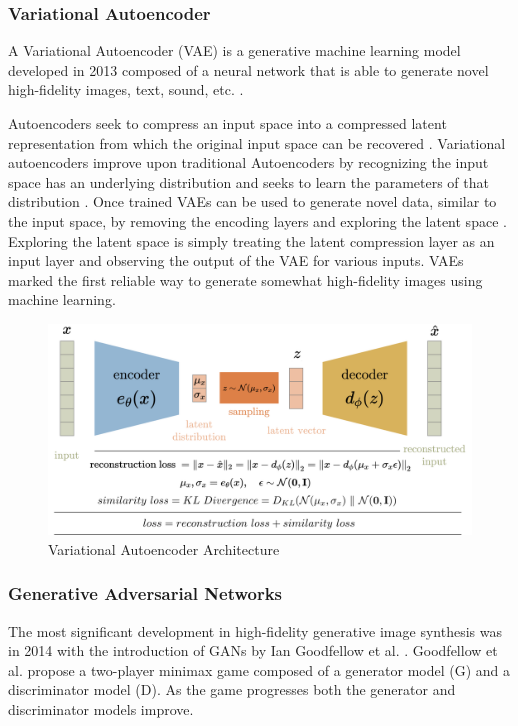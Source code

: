 \documentclass[%
 reprint,
 amsmath,amssymb,
 aps,
]{revtex4-2}
\begin{document}
\subsubsection{Variational Autoencoder}
A Variational Autoencoder (VAE) is a generative machine learning model developed in 2013 composed of a neural network that is able to generate novel high-fidelity images, text, sound, etc. \cite{kingma2014autoencoding}.


Autoencoders seek to compress an input space into a compressed latent representation from which the original input space can be recovered \cite{kingma2014autoencoding}. Variational autoencoders improve upon traditional Autoencoders by recognizing the input space has an underlying distribution and seeks to learn the parameters of that distribution \cite{kingma2014autoencoding}. Once trained VAEs can be used to generate novel data, similar to the input space, by removing the encoding layers and exploring the latent space \cite{kingma2014autoencoding}. Exploring the latent space is simply treating the latent compression layer as an input layer and observing the output of the VAE for various inputs. VAEs marked the first reliable way to generate somewhat high-fidelity images using machine learning\cite{rocca_2021}.

\begin{figure}[h]
    \includegraphics[width=0.9\columnwidth]{vae.png}
    \caption{\label{fig:vae} Variational Autoencoder Architecture \cite{rocca_2021}}
\end{figure}

\subsubsection{Generative Adversarial Networks}
\label{VG}
The most significant development in high-fidelity generative image synthesis was in 2014 with the introduction of  GANs by Ian Goodfellow et al. \cite{goodfellow2014generative}. Goodfellow et al. propose a two-player minimax game composed of a generator model (G) and a discriminator model (D). As the game progresses both the generator and discriminator models improve.
\end{document}
